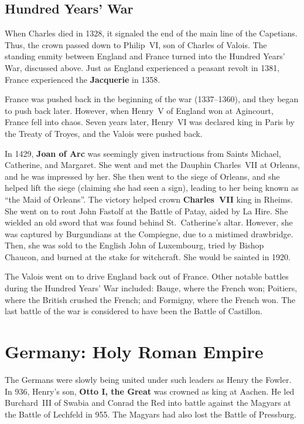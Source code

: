 \subsection*{Hundred Years' War}

When Charles died in 1328, it signaled the end of the main line of the Capetians.
Thus, the crown passed down to Philip~VI, son of Charles of Valois.
The standing enmity between England and France turned into the Hundred Years' War, discussed above.
Just as England experienced a peasant revolt in 1381, France experienced the \textbf{Jacquerie} in 1358.

France was pushed back in the beginning of the war (1337--1360), and they began to push back later.
However, when Henry~V of England won at Agincourt, France fell into chaos.
Seven years later, Henry~VI was declared king in Paris by the Treaty of Troyes, and the Valois were pushed back.

In 1429, \textbf{Joan of Arc} was seemingly given instructions from Saints Michael, Catherine, and Margaret.
She went and met the Dauphin Charles~VII at Orleans, and he was impressed by her.
She then went to the siege of Orleans, and she helped lift the siege (claiming she had seen a sign),
leading to her being known as ``the Maid of Orleans''.
The victory helped crown \textbf{Charles~VII} king in Rheims.
She went on to rout John Fastolf at the Battle of Patay, aided by La Hire.
She wielded an old sword that was found behind St.\ Catherine's altar.
However, she was captured by Burgundians at the Compiegne, due to a mistimed drawbridge.
Then, she was sold to the English John of Luxembourg, tried by Bishop Chaucon, and burned at the stake for witchcraft.
She would be sainted in 1920.

The Valois went on to drive England back out of France.
Other notable battles during the Hundred Years' War included:
Bauge, where the French won;
Poitiers, where the British crushed the French;
and Formigny, where the French won.
The last battle of the war is considered to have been the Battle of Castillon.


\section{Germany: Holy Roman Empire}

The Germans were slowly being united under such leaders as Henry the Fowler.
In 936, Henry's son, \textbf{Otto I, the Great} was crowned as king at Aachen.
He led Burchard~III of Swabia and Conrad the Red into battle
against the Magyars at the Battle of Lechfeld in 955.
The Magyars had also lost the Battle of Pressburg.

